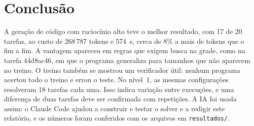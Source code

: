\documentclass{article}
\begin{document}
\section{Conclusão}

A geração de código com raciocínio alto teve o melhor resultado, com 17 de 20 tarefas, ao custo
de 268\,787 tokens e 574~s, cerca de 8\% a mais de tokens que o fim a fim. A vantagem
apareceu em regras que exigem busca na grade, como na tarefa 44d8ac46, em que o programa
generaliza para tamanhos que não aparecem no treino. O treino também se mostrou um verificador
útil: nenhum programa acertou todo o treino e errou o teste. No nível~1, as mesmas
configurações resolveram 18 tarefas cada uma. Isso indica variação entre execuções, e uma
diferença de duas tarefas deve ser confirmada com repetições. A IA foi usada assim: o Claude
Code ajudou a construir e testar o solver e a redigir este relatório, e os números foram
conferidos com os arquivos em \texttt{resultados/}.



\end{document}
